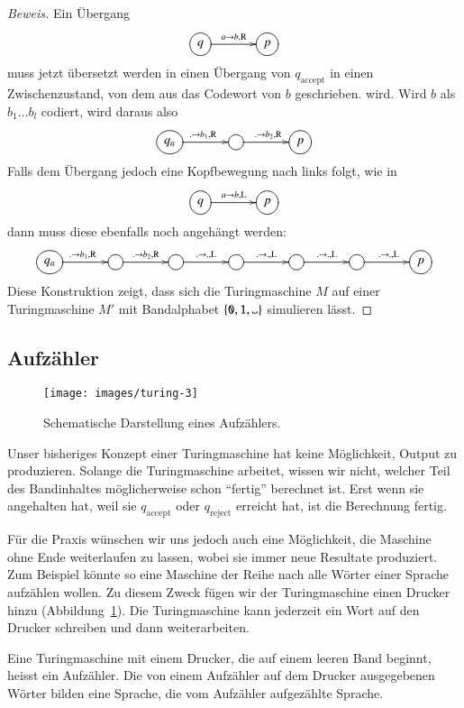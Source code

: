 \begin{proof}[Beweis]
Ein Übergang
\[
\entrymodifiers={++[o][F]}
\xymatrix@C+1pc{
q\ar[r]^{a\to b,\text{R}}
	&p
}
\]
muss jetzt übersetzt werden in einen Übergang von $q_\text{accept}$ in einen
Zwischenzustand, von dem aus das Codewort von $b$ geschrieben.
wird. Wird $b$ als $b_1\dots b_l$ codiert, wird daraus also
\[
\entrymodifiers={++[o][F]}
\xymatrix@C+1pc{
q_a\ar[r]^{.\to b_1,\text{R}}
	&\ar[r]^{.\to b_2,\text{R}}
		&p
}
\]
Falls dem Übergang jedoch eine Kopfbewegung nach links folgt, wie in
\[
\entrymodifiers={++[o][F]}
\xymatrix@C+1pc{
q\ar[r]^{a\to b,\text{L}}
	&p
}
\]
dann muss diese ebenfalls noch angehängt werden:
\[
\entrymodifiers={++[o][F]}
\xymatrix@C+1pc{
q_a\ar[r]^{.\to b_1,\text{R}}
	&\ar[r]^{.\to b_2,\text{R}}
		&\ar[r]^{.\to .,\text{L}}
			&\ar[r]^{.\to .,\text{L}}
				&\ar[r]^{.\to .,\text{L}}
					&\ar[r]^{.\to .,\text{L}}
						&p
}
\]
Diese Konstruktion zeigt, dass sich die Turingmaschine $M$ auf einer
Turingmaschine $M'$ mit Bandalphabet $\{\texttt{0},\texttt{1},\blank\}$ simulieren
lässt.
\end{proof}

\subsection{Aufzähler}
\begin{figure}
\begin{center}
\texttt{[image: images/turing-3]}
\end{center}
\caption{Schematische Darstellung eines Aufzählers.\label{turing-aufzaehler}}
\end{figure}
Unser bisheriges Konzept einer Turingmaschine hat keine Möglichkeit,
Output zu produzieren. Solange die Turingmaschine arbeitet, wissen wir
nicht, welcher Teil des Bandinhaltes möglicherweise schon ``fertig''
berechnet ist. Erst wenn sie angehalten hat, weil sie $q_{\text{accept}}$
oder $q_{\text{reject}}$ erreicht hat, ist die Berechnung fertig.

Für die Praxis wünschen wir uns jedoch auch eine Möglichkeit,
die Maschine ohne Ende weiterlaufen zu lassen, wobei sie immer neue
Resultate produziert. Zum Beispiel könnte so eine Maschine der Reihe
nach alle Wörter einer Sprache aufzählen wollen. Zu diesem Zweck
fügen wir der Turingmaschine einen Drucker hinzu
(Abbildung~\ref{turing-aufzaehler}). Die Turingmaschine
kann jederzeit ein Wort auf den Drucker schreiben und dann
weiterarbeiten.

\begin{definition}
%
Eine Turingmaschine mit einem Drucker, die auf einem leeren Band beginnt,
heisst ein Aufzähler. Die von einem Aufzähler auf dem Drucker ausgegebenen
Wörter bilden eine Sprache, die vom Aufzähler aufgezählte Sprache.
\end{definition}

